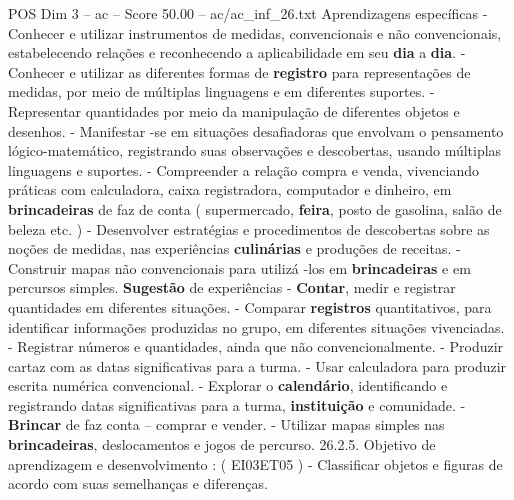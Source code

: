 \begin{textsample}{POS Dim 3 – ac – Score 50.00 – ac/ac\_inf\_26.txt}
Aprendizagens específicas - Conhecer e utilizar instrumentos de medidas, convencionais e não convencionais, estabelecendo relações e reconhecendo a aplicabilidade em seu \textbf{dia} a \textbf{dia}. - Conhecer e utilizar as diferentes formas de \textbf{registro} para representações de medidas, por meio de múltiplas linguagens e em diferentes suportes. - Representar quantidades por meio da manipulação de diferentes objetos e desenhos. - Manifestar -se em situações desafiadoras que envolvam o pensamento lógico-matemático, registrando suas observações e descobertas, usando múltiplas linguagens e suportes. - Compreender a relação compra e venda, vivenciando práticas com calculadora, caixa registradora, computador e dinheiro, em \textbf{brincadeiras} de faz de conta ( supermercado, \textbf{feira}, posto de gasolina, salão de beleza etc. ) - Desenvolver estratégias e procedimentos de descobertas sobre as noções de medidas, nas experiências \textbf{culinárias} e produções de receitas. - Construir mapas não convencionais para utilizá -los em \textbf{brincadeiras} e em percursos simples. \textbf{Sugestão} de experiências - \textbf{Contar}, medir e registrar quantidades em diferentes situações. - Comparar \textbf{registros} quantitativos, para identificar informações produzidas no grupo, em diferentes situações vivenciadas. - Registrar números e quantidades, ainda que não convencionalmente. - Produzir cartaz com as datas significativas para a turma. - Usar calculadora para produzir escrita numérica convencional. - Explorar o \textbf{calendário}, identificando e registrando datas significativas para a turma, \textbf{instituição} e comunidade. - \textbf{Brincar} de faz conta – comprar e vender. - Utilizar mapas simples nas \textbf{brincadeiras}, deslocamentos e jogos de percurso. 26.2.5.
Objetivo de aprendizagem e desenvolvimento : ( EI03ET05 ) - Classificar objetos e figuras de acordo com suas semelhanças e diferenças.

\end{textsample}
